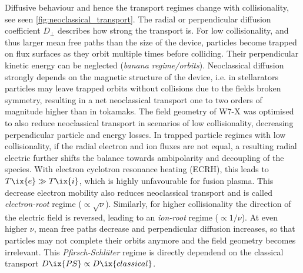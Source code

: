 %
                Diffusive behaviour and hence the transport regimes change with collisionality, see seen \cref{fig:neoclassical_transport}. The radial or perpendicular diffusion coefficient $D_{\perp}$ describes how strong the transport is. For low collisionality, and thus larger mean free paths than the size of the device, particles become trapped on flux surfaces as they orbit multiple times before colliding. Their perpendicular kinetic energy can be neglected (\textit{banana regime/orbits}). Neoclassical diffusion strongly depends on the magnetic structure of the device, i.e. in stellarators particles may leave trapped orbits without collisions due to the fields broken symmetry, resulting in a net neoclassical transport one to two orders of magnitude higher than in tokamaks. The field geometry of W7-X was optimised to also reduce neoclassical transport in scenarios of low collisionality, decreasing perpendicular particle and energy losses. In trapped particle regimes with low collisionality, if the radial electron and ion fluxes are not equal, a resulting radial electric further shifts the balance towards ambipolarity and decoupling of the species. With electron cyclotron resonance heating (ECRH), this leads to $T\ix{e}\gg T\ix{i}$, which is highly unfavourable for fusion plasma. This decrease electron mobility also reduces neoclassical transport and is called \textit{electron-root} regime ($\propto \sqrt{\nu}$). Similarly, for higher collisionality the direction of the electric field is reversed, leading to an \textit{ion-root} regime ($\propto 1/\nu$). At even higher $\nu$, mean free paths decrease and perpendicular diffusion increases, so that particles may not complete their orbits anymore and the field geometry becomes irrelevant. This \textit{Pfirsch-Schlüter} regime is directly dependend on the classical transport $D\ix{PS}\propto D\ix{classical}$\cite{Helander2012,Helander2014}.%
%
